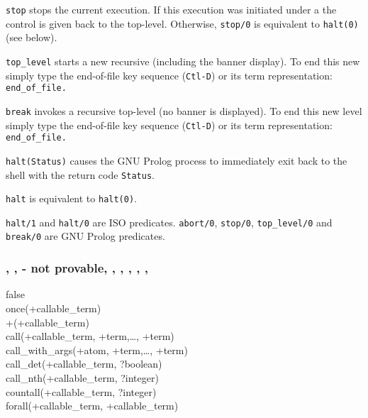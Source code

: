 \texttt{stop} stops the current execution. If this execution was initiated
under a  the control is given back to the
top-level. Otherwise, \texttt{stop/0} is equivalent to \texttt{halt(0)}
(see below).

\texttt{top\_level} starts a new recursive  (including the
banner display). To end this new  simply type the end-of-file
key sequence (\texttt{Ctl-D}) or its term representation:
\texttt{end\_of\_file.}

\texttt{break} invokes a recursive top-level (no banner is displayed). To
end this new level simply type the end-of-file key sequence (\texttt{Ctl-D})
or its term representation: \texttt{end\_of\_file.}

\texttt{halt(Status)} causes the GNU Prolog process to immediately exit back to
the shell with the return code \texttt{Status}.

\texttt{halt} is equivalent to \texttt{halt(0)}.

\begin{PlErrors}



\end{PlErrors}

\Portability

\texttt{halt/1} and \texttt{halt/0} are ISO predicates. \texttt{abort/0},
\texttt{stop/0}, \texttt{top\_level/0} and \texttt{break/0} are GNU Prolog
predicates.

\subsubsection{, ,  - not provable,
               ,
               , , , , }

\begin{TemplatesOneCol}
false\\
once(+callable\_term)\\
{\bs}+(+callable\_term) \\
call(+callable\_term, +term,\ldots, +term)\\
call\_with\_args(+atom, +term,\ldots, +term)\\
call\_det(+callable\_term, ?boolean) \\
call\_nth(+callable\_term, ?integer) \\
countall(+callable\_term, ?integer) \\
forall(+callable\_term, +callable\_term)

\end{TemplatesOneCol}

